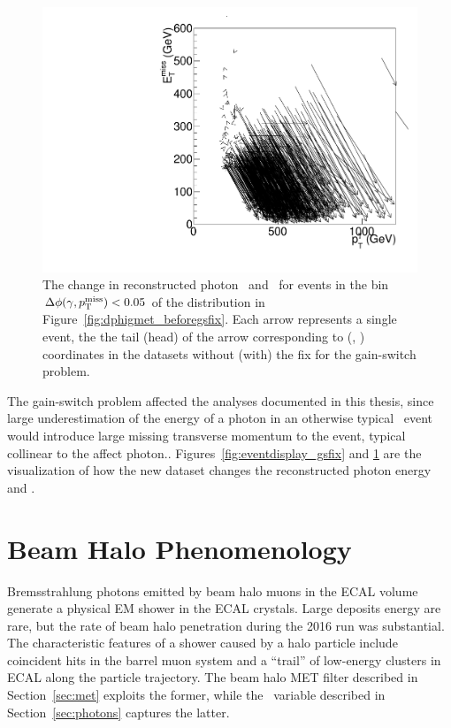 \begin{figure}[htbp]
  \centering
  \includegraphics[width=0.48\linewidth]{Reconstruction/Figures/gsfix/movements.pdf}
  \caption{
    The change in reconstructed photon \pt\ and \met\ for events in the bin $\Delta \phi(\gamma, p_{\mathrm{T}}^\text{miss}) < 0.05$ of the distribution in Figure~\ref{fig:dphigmet_beforegsfix}. 
    Each arrow represents a single event, the the tail (head) of the arrow corresponding to (\ETg, \met) coordinates in the datasets without (with) the fix for the gain-switch problem.
  }
  \label{fig:ptshift_gsfix}
\end{figure}

The gain-switch problem affected the analyses documented in this thesis, since large underestimation of the energy of a photon in an otherwise typical \gj\ event would introduce large missing transverse momentum to the event, typical collinear to the affect photon.. 
Figures~\ref{fig:eventdisplay_gsfix} and \ref{fig:ptshift_gsfix} are the visualization of how the new dataset changes the reconstructed photon energy and \met.

\section{Beam Halo Phenomenology}
\label{sec:halo}

Bremsstrahlung photons emitted by beam halo muons in the ECAL volume generate a physical EM shower in the ECAL crystals. 
Large deposits energy are rare, but the rate of beam halo penetration during the 2016 run was substantial. 
The characteristic features of a shower caused by a halo particle include coincident hits in the barrel muon system and a ``trail'' of low-energy clusters in ECAL along the particle trajectory. 
The beam halo MET filter described in Section~\ref{sec:met} exploits the former, while the \emip\ variable described in Section~\ref{sec:photons} captures the latter.

